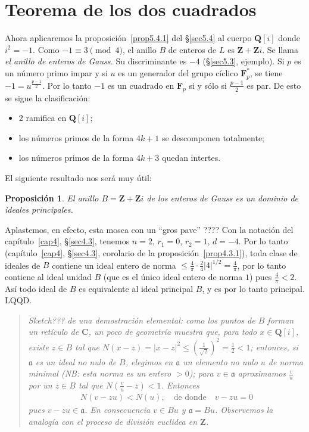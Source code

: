 \documentclass[bibtotoc,leqno,spanish]{amsbook}
\newcommand{\QQ}{\mathbf{Q}}
\newcommand{\ZZ}{\mathbf{Z}}
\newcommand{\FF}{\mathbf{F}}
\newcommand{\CC}{\mathbf{C}}
\newcommand{\idl}[1]{\mathfrak{#1}}
\newcommand{\QED}{LQQD.}
\newcommand{\abs}[1]{\left\lvert#1\right\rvert}
\numberwithin{equation}{section}
\newenvironment{comm}%
	{\begin{quotation}\itshape}
	{\end{quotation}}
\theoremstyle{note}
\theoremstyle{note}
\newtheorem{proposition}{Proposici\'on}
\theoremstyle{rem}
\numberwithin{theorem}{section}
\numberwithin{proposition}{section}
\numberwithin{definition}{section}
\numberwithin{lemma}{section}
\numberwithin{corollary}{section}
\numberwithin{example}{section}
\numberwithin{footnote}{section}%
\begin{document}
\section{Teorema de los dos cuadrados}\label{sec5.6}

Ahora aplicaremos la proposici\'on~\ref{prop5.4.1} del \S\ref{sec5.4} al cuerpo $\QQ[i]$ donde $i^{2}=-1$. Como $-1\equiv 3\pmod 4$,
el anillo $B$ de enteros de $L$ es $\ZZ+\ZZ i$. Se llama {\em el anillo de enteros de Gauss.} Su discriminante
es $-4$ (\S\ref{sec5.3}, ejemplo). Si $p$ es un n\'umero primo impar y si $u$ es un generador del grupo c\'iclico
$\FF_{p}^{*}$, se tiene $-1=u^{\frac{p-1}{2}}$. Por lo tanto $-1$ es un cuadrado en $\FF_{p}$ si y s\'olo si
$\frac{p-1}{2}$ es par. De esto se sigue la clasificaci\'on:
\begin{itemize}
\item $2$ ramifica en $\QQ[i]$;
\item los n\'umeros primos de la forma $4k+1$ se descomponen totalmente;
\item los n\'umeros primos de la forma $4k+3$ quedan intertes.
\end{itemize}
El siguiente resultado nos ser\'a muy \'util:

\begin{proposition}\label{prop5.6.1}
El anillo $B = \ZZ+\ZZ i$ de los enteros de Gauss es un dominio de ideales principales.
\end{proposition}

Aplastemos, en efecto, esta mosca con un ``gros pave'' ???? Con la notaci\'on del cap\'itulo~\ref{cap4},
\S\ref{sec4.3}, tenemos $n=2$, $r_{1}=0$, $r_{2}=1$, $d=-4$. Por lo tanto (cap\'itulo~\ref{cap4}, \S\ref{sec4.3},
corolario de la proposici\'on~\ref{prop4.3.1}),
toda clase de ideales de $B$ contiene un ideal entero de norma $\leq\frac{4}{\pi}\cdot\frac{2}{4}
\abs{4}^{1/2}=\frac{4}{\pi}$, por lo tanto contiene al ideal unidad $B$ (que es el \'unico ideal entero de
norma $1$) pues $\frac{4}{\pi}<2$. As\'i todo ideal de $B$ es equivalente al ideal principal $B$, y es por
lo tanto principal. \QED

\begin{comm}
{\em Sketch???} de una demostraci\'on elemental: como los puntos de $B$ forman un ret\'iculo de $\CC$,
un poco de geometr\'ia muestra que, para todo $x\in\QQ[i]$, existe $z\in B$ tal que
$N(x-z)=\abs{x-z}^{2}\leq\left(\frac{1}{\sqrt{2}}\right)^{2}=\frac{1}{2}< 1$; entonces, si $\idl{a}$ es un
ideal no nulo de $B$, elegimos en $\idl{a}$ un elemento no nulo $u$ de norma minimal (NB: esta norma es un
entero $>0$); para $v\in\idl{a}$ aproximamos $\frac{v}{u}$ por un $z\in B$ tal que $N\left(\frac{v}{u}-z\right)<1$.
Entonces
\begin{gather*}
N(v-zu) < N(u),\quad\text{de donde}\quad v-zu=0
\end{gather*}
pues $v-zu\in\idl{a}$. En consecuencia $v\in Bu$ y $\idl{a}=Bu$. Observemos la analog\'ia con el proceso de
divisi\'on euclidea en $\ZZ$.
\end{comm}
\end{document}
